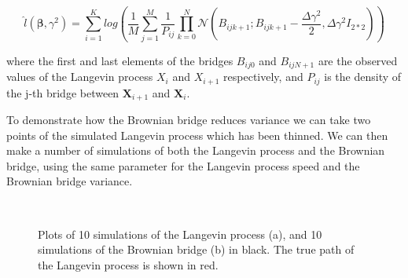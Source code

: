 $$
\hat{l}(\bm \beta, \gamma^2) = \sum_{i = 1}^K log( \frac{1}{M}\sum_{j=1}^M \frac{1}{P_{ij}}\prod_{k=0}^N \mathcal{N}(B_{ijk+1} ; B_{ijk+1} - \frac{\Delta \gamma^2}{2}, \Delta\gamma^2 I_{2*2}))
$$

where the first and last elements of the bridges $B_{ij0}$ and $B_{ijN+1}$ are the observed values of the Langevin process $X_i$ and $X_{i+1}$ respectively, and $P_{ij}$ is the density of the j-th bridge between $\textbf{X}_{i+1}$ and $\textbf{X}_i$.

To demonstrate how the Brownian bridge reduces variance we can take two points of the simulated Langevin process which has been thinned. We can then make a number of simulations of both the Langevin process and the Brownian bridge, using the same parameter for the Langevin process speed and the Brownian bridge variance.

\

\begin{figure}[H]%
    \centering
    \qquad
    \caption[Langevin and Brownian bridge paths]{Plots of 10 simulations of the Langevin process (a), and 10 simulations of the Brownian bridge (b) in black. The true path of the Langevin process is shown in red.}%
    \label{fig:monte carlo paths}%
\end{figure}


